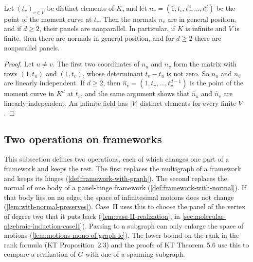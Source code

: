 \begin{lemma}
  \label{lem:moment-curve-general-position}
  \leanok
  Let $(t_v)_{v \in V}$ be distinct elements of $K$, and let
  $n_v = (1, t_v, t_v^2, \dots, t_v^{d})$ be the point of the moment
  curve at $t_v$. Then the normals $n_v$ are in general position, and if
  $d \ge 2$, their panels are nonparallel. In particular, if $K$ is
  infinite and $V$ is finite, then there are normals in general
  position, and for $d \ge 2$ there are nonparallel panels.
\end{lemma}
\begin{proof}
  \leanok
  Let $u \neq v$. The first two coordinates of $n_u$ and $n_v$ form the
  matrix with rows $(1, t_u)$ and $(1, t_v)$, whose determinant
  $t_v - t_u$ is not zero. So $n_u$ and $n_v$ are linearly independent.
  If $d \ge 2$, then $\hat n_v = (1, t_v, \dots, t_v^{d-1})$ is the point
  of the moment curve in $K^d$ at $t_v$, and the same argument shows that
  $\hat n_u$ and $\hat n_v$ are linearly independent. An infinite field
  has $|V|$ distinct elements for every finite $V$.
\end{proof}

\subsection{Two operations on frameworks}
\label{sec:molecular-algebraic-induction-withgraph}

This subsection defines two operations, each of which changes one part
of a framework and keeps the rest. The first replaces the multigraph of
a framework and keeps its hinges (\cref{def:framework-with-graph}). The
second replaces the normal of one body of a panel-hinge framework
(\cref{def:framework-with-normal}). If that body lies on no edge, the
space of infinitesimal motions does not change
(\cref{lem:with-normal-preserves}). Case~II uses
this to choose the panel of the vertex of degree two that it puts back
(\cref{lem:case-II-realization}, in
\cref{sec:molecular-algebraic-induction-caseII}). Passing to a subgraph
can only enlarge the space of motions
(\cref{lem:motions-mono-of-graph-le}). The lower bound on the rank in the rank formula (KT Proposition~2.3)
and the proofs of KT Theorem~5.6 use this to compare a
realization of $G$ with one of a spanning subgraph.

